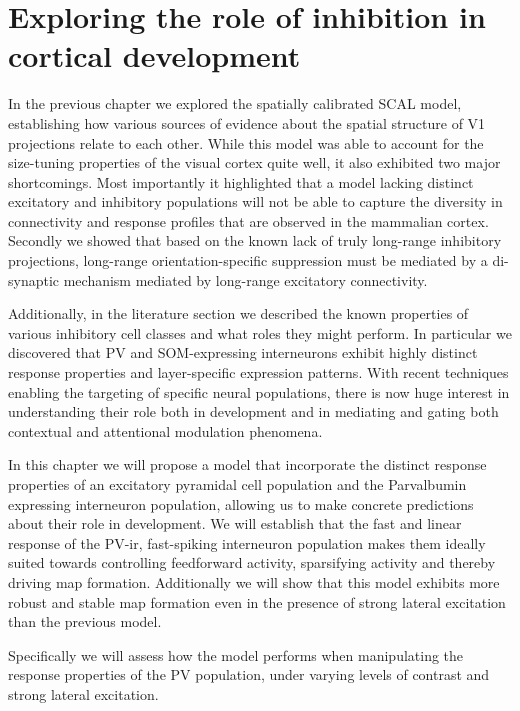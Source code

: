 \chapter{Exploring the role of inhibition in cortical development}

In the previous chapter we explored the spatially calibrated SCAL
model, establishing how various sources of evidence about the spatial
structure of V1 projections relate to each other. While this model was
able to account for the size-tuning properties of the visual cortex
quite well, it also exhibited two major shortcomings. Most importantly
it highlighted that a model lacking distinct excitatory and inhibitory
populations will not be able to capture the diversity in connectivity
and response profiles that are observed in the mammalian
cortex. Secondly we showed that based on the known lack of truly
long-range inhibitory projections, long-range orientation-specific
suppression must be mediated by a di-synaptic mechanism mediated by
long-range excitatory connectivity.

Additionally, in the literature section we described the known
properties of various inhibitory cell classes and what roles they
might perform. In particular we discovered that PV and SOM-expressing
interneurons exhibit highly distinct response properties and
layer-specific expression patterns. With recent techniques enabling
the targeting of specific neural populations, there is now huge
interest in understanding their role both in development and in
mediating and gating both contextual and attentional modulation
phenomena.

In this chapter we will propose a model that incorporate the distinct
response properties of an excitatory pyramidal cell population and the
Parvalbumin expressing interneuron population, allowing us to make
concrete predictions about their role in development. We will
establish that the fast and linear response of the PV-ir, fast-spiking
interneuron population makes them ideally suited towards controlling
feedforward activity, sparsifying activity and thereby driving map
formation. Additionally we will show that this model exhibits more
robust and stable map formation even in the presence of strong lateral
excitation than the previous model.

Specifically we will assess how the model performs when manipulating
the response properties of the PV population, under varying levels of
contrast and strong lateral excitation.

